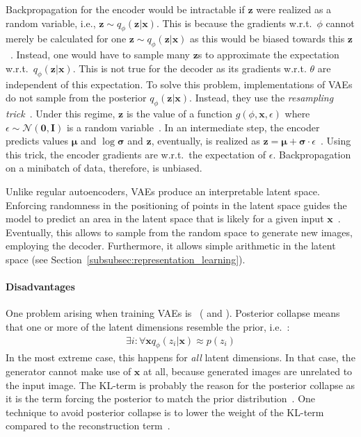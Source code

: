 Backpropagation for the encoder would be intractable if $\bm{z}$ were realized as a random variable, i.e., $\bm{z} \sim q_\phi(\bm{z}|\bm{x})$.
This is because the gradients w.r.t.~$\phi$ cannot merely be calculated for one $\bm{z} \sim q_\phi(\bm{z}|\bm{x})$ as this would be biased towards this $\bm{z}$~\citep{kingma2019introduction}.
Instead, one would have to sample many $\bm{z}$s to approximate the expectation w.r.t.~$q_\phi(\bm{z}|\bm{x})$.
This is not true for the decoder as its gradients w.r.t. $\theta$ are independent of this expectation.
To solve this problem, implementations of \acp{VAE} do not sample from the posterior $q_\phi(\bm{z}|\bm{x})$.
Instead, they use the \textit{resampling trick}~\citep{kingma2019introduction}.
Under this regime, $\bm{z}$ is the value of a function $g(\phi, \bm{x}, \epsilon)$ where $\epsilon \sim \mathcal{N}(\bm{0}, \bm{I})$ is a random variable~\citep{kingma2019introduction}.
In an intermediate step, the encoder predicts values $\bm{\mu}$ and $\log \bm{\sigma}$ and $\bm{z}$, eventually, is realized as $\bm{z} = \bm{\mu} + \bm{\sigma} \cdot \epsilon$~\citep{kingma2019introduction}.
Using this trick, the encoder gradients are w.r.t.~the expectation of $\epsilon$.
Backpropagation on a minibatch of data, therefore, is unbiased.

Unlike regular autoencoders, \acp{VAE} produce an interpretable latent space.
Enforcing randomness in the positioning of points in the latent space guides the model to predict an area in the latent space that is likely for a given input $\bm{x}$~\citep[p. 701]{Goodfellow-et-al-2016}.
Eventually, this allows to sample from the random space to generate new images, employing the decoder.
Furthermore, it allows simple arithmetic in the latent space (see Section~\ref{subsubsec:representation_learning}).

\paragraph{Disadvantages}

One problem arising when training \acp{VAE} is ~(\citep{lucas2019understanding} and \citep[p. 694]{Goodfellow-et-al-2016}).
Posterior collapse means that one or more of the latent dimensions resemble the prior, i.e.~\citep{lucas2019understanding}:
\begin{align}
    \exists i: \forall \mathbf{x} q_{\phi}\left(z_{i} | \mathbf{x}\right) \approx p\left(z_{i}\right)
\end{align}
In the most extreme case, this happens for \textit{all} latent dimensions.
In that case, the generator cannot make use of $\bm{x}$ at all, because generated images are unrelated to the input image.
The KL-term is probably the reason for the posterior collapse as it is the term forcing the posterior to match the prior distribution~\citep{lucas2019understanding}.
One technique to avoid posterior collapse is to lower the weight of the KL-term compared to the reconstruction term~\citep{lucas2019understanding}.

